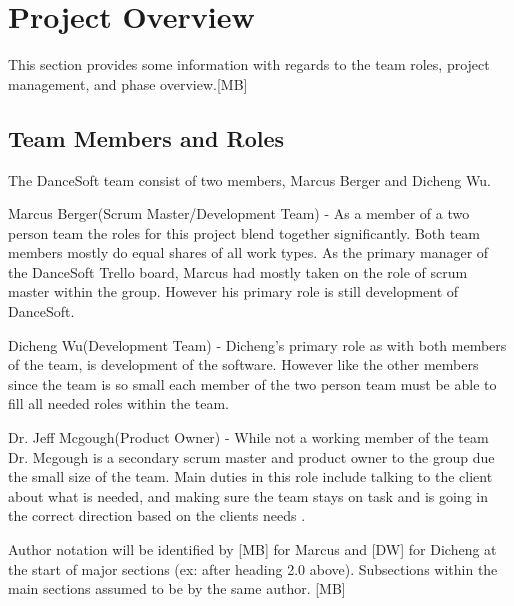 

\chapter{Project Overview}
This section provides some information with regards to the 
team roles, project management, and phase overview.[MB]

\section{Team Members and Roles}
The DanceSoft team consist of two members, Marcus Berger and Dicheng Wu.

Marcus Berger(Scrum Master/Development Team) -  As a member of a two person team the roles for this project blend together significantly. Both team members mostly do equal shares of all work types. As the primary manager of the DanceSoft Trello board, Marcus had mostly taken on the role of scrum master within the group. However his primary role is still development of DanceSoft.

Dicheng Wu(Development Team) - Dicheng's primary role as with both members of the team, is development of the software. However like the other members since the team is so small each member of the two person team must be able to fill all needed roles within the team.

Dr. Jeff Mcgough(Product Owner) - While not a working member of the team Dr. Mcgough is a secondary scrum master and product owner to the group due the small size of the team. Main duties in this role include talking to the client about what is needed, and making sure the team stays on task and is going in the correct direction based on the clients needs .

Author notation will be identified by [MB] for Marcus and [DW] for Dicheng at the start of
major sections (ex: after heading 2.0 above). Subsections within the main sections assumed to be by the
same author. [MB] 


